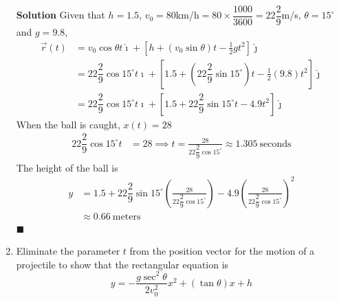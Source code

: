 \documentclass{report}
\begin{document}
\begin{enumerate}
          \textbf{Solution} Given that $h = 1.5$, $v_0 = 80$km/h$=80\times\dfrac{1000}{3600}=22\dfrac{2}{9}$m/s, $\theta = 15^{\circ}$ and $g = 9.8$,
          \begin{align*}
              \vec{r}(t) & = v_0\cos\theta t\hat{\imath} + \left[h + (v_0\sin\theta) t - \frac{1}{2}gt^2\right]\hat{\jmath}                                         \\
                         & = 22\dfrac{2}{9}\cos{15^{\circ}} t\hat{\imath} + \left[1.5 + (22\dfrac{2}{9}\sin{15^{\circ}}) t - \frac{1}{2}(9.8)t^2\right]\hat{\jmath} \\
                         & = 22\dfrac{2}{9}\cos{15^{\circ}} t\hat{\imath} + \left[1.5 + 22\dfrac{2}{9}\sin{15^{\circ}} t - 4.9t^2\right]\hat{\jmath}
          \end{align*}
          When the ball is caught, $x(t) = 28$
          \begin{align*}
              22\dfrac{2}{9}\cos{15^{\circ}} t & = 28 \implies t = \frac{28}{22\dfrac{2}{9}\cos{15^{\circ}}} \approx 1.305\ \text{seconds}
          \end{align*}
          The height of the ball is
          \begin{align*}
              y & = 1.5 + 22\dfrac{2}{9}\sin{15^{\circ}} \left(\frac{28}{22\dfrac{2}{9}\cos{15^{\circ}}}\right) - 4.9\left(\frac{28}{22\dfrac{2}{9}\cos{15^{\circ}}}\right)^2 \\
                & \approx 0.66\ \text{meters}
          \end{align*} \hfill$\blacksquare$

          \newpage
    \item Eliminate the parameter $t$ from the position vector for the motion of a
          projectile to show that the rectangular equation is $$ y=-\frac{g \sec ^2
                  \theta}{2 v_0^2} x^2+(\tan \theta) x+h $$


\end{enumerate}
\end{document}
